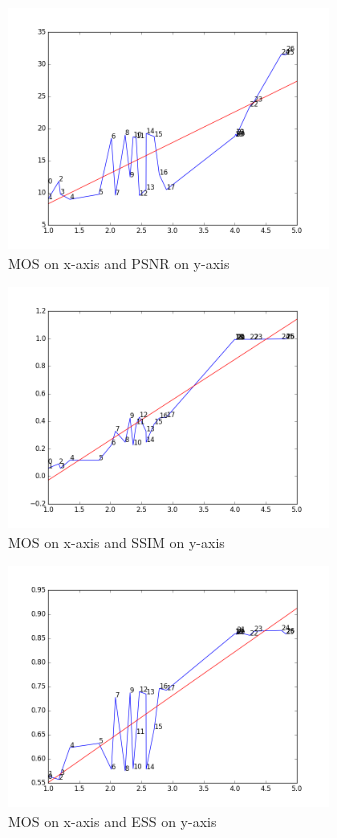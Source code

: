 \documentclass{article}
\begin{document}
\begin{figure}[ht]
  \centering
  \includegraphics[width=8.5cm]{figures/mos_psnr}
  \caption{MOS on x-axis and PSNR on y-axis\label{fig:psnr} }
\end{figure}
\begin{figure}[ht]
  \centering
  \includegraphics[width=8.5cm]{figures/mos_ssim}
  \caption{MOS on x-axis and SSIM on y-axis\label{fig:ssim} }
\end{figure}
\begin{figure}[ht]
  \centering
  \includegraphics[width=8.5cm]{figures/mos_ess}
  \caption{MOS on x-axis and ESS on y-axis\label{fig:ess} }
\end{figure}
\end{document}
